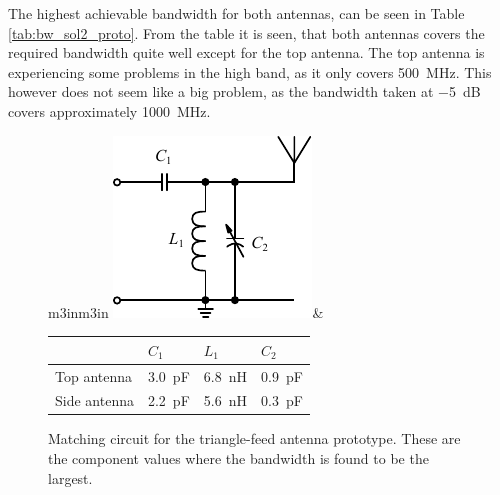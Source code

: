 The highest achievable bandwidth for both antennas, can be seen in Table \ref{tab:bw_sol2_proto}. From the table it is seen, that both antennas covers the required bandwidth quite well except for the top antenna. The top antenna is experiencing some problems in the high band, as it only covers \SI{500}{MHz}. This however does not seem like a big problem, as the bandwidth taken at \SI{-5}{dB} covers approximately \SI{1000}{MHz}.

\begin{figure}[htbp]
        \centering
        \begin{tabular}{m{3in}m{3in}}
            \centering
            \includegraphics{img/tech_sol/schematic_tuning_1}&
            \centering
            \footnotesize
            \begin{tabular}{|l|l|l|l|}
                \hline
                & $C_1$ & $L_1$ & $C_2$ \\
                \hline
                Top antenna & \SI{3.0}{pF} & \SI{6.8}{nH} & \SI{0.9}{pF} \\
                Side antenna & \SI{2.2}{pF} & \SI{5.6}{nH} & \SI{0.3}{pF} \\
                \hline
            \end{tabular}
        \end{tabular}
    \caption{Matching circuit for the triangle-feed antenna prototype. These are the component values where the bandwidth is found to be the largest.}
    \label{fig:triang_proto_matching}
\end{figure}

